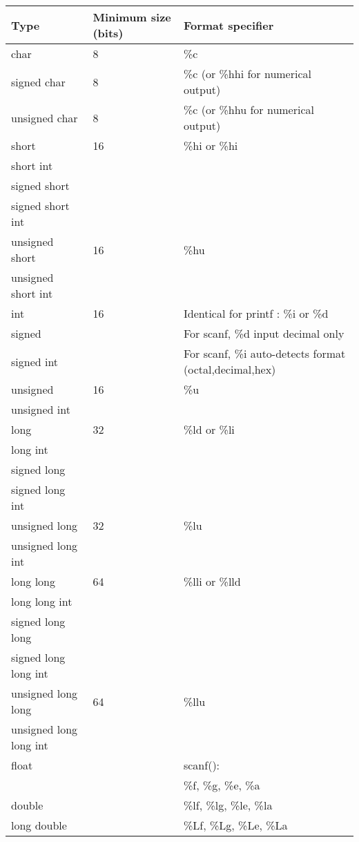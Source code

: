 \begin{frame}[fragile]
\begin{columns}
\pause
\begin{column}[c]{0.60\textwidth}
{\tiny
\begin{tabular}{|l|l|l|} \hline
Type & Minimum size (bits) & Format specifier \\ \hline
%
char & 8 & \%c \\ \hline
%
signed char & 8 & \%c (or \%hhi for numerical output) \\ \hline
%
unsigned char & 8 & \%c (or \%hhu for numerical output) \\ \hline
%
short & 16 & \%hi or \%hi \\
short int &  &  \\
signed short &  &  \\
signed short int &  &  \\ \hline
%
unsigned short & 16 & \%hu \\
unsigned short int &  &  \\ \hline
%
int & 16 & Identical for printf : \%i or \%d \\
signed &  & For scanf, \%d input decimal only \\
signed int &  & For scanf, \%i auto-detects format (octal,decimal,hex)\\ \hline
%
unsigned & 16 & \%u \\
unsigned int &  &  \\ \hline
%
long & 32 & \%ld or \%li \\
long int &  &  \\
signed long &  &  \\
signed long int &  &  \\ \hline
%
unsigned long & 32 & \%lu \\
unsigned long int &  &  \\ \hline
long long & 64 & \%lli or \%lld \\
long long int &  &  \\
signed long long &  &  \\
signed long long int &  &  \\ \hline
%
unsigned long long & 64 & \%llu \\
unsigned long long int &  &  \\ \hline
%
float &  & scanf(): \\
 &  & \%f, \%g, \%e, \%a \\ \hline
%
double &  & \%lf, \%lg, \%le, \%la \\ \hline 
%
long double & & \%Lf, \%Lg, \%Le, \%La \\ \hline
\end{tabular}
}
\end{column}

\end{columns}
\end{frame}

